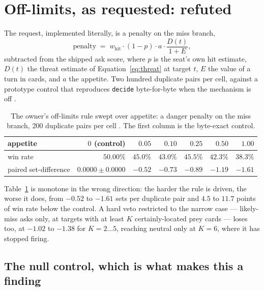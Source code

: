\documentclass[11pt]{article}
\newcommand{\code}[1]{\texttt{#1}}
\begin{document}
\section{Off-limits, as requested: refuted}
\label{sec:offlimits}

The request, implemented literally, is a penalty on the miss branch,
\begin{equation}
\label{eq:penalty}
\text{penalty} \;=\; w_{\mathrm{hit}} \cdot (1-p) \cdot a \cdot \frac{D(t)}{1+E},
\end{equation}
subtracted from the shipped ask score, where $p$ is the seat's own hit estimate, $D(t)$ the threat
estimate of Equation~\eqref{eq:threat} at target $t$, $E$ the value of a turn in cards, and $a$ the
appetite. Two hundred duplicate pairs per cell, against a prototype control that reproduces
\code{decide} byte-for-byte when the mechanism is off \cite{concession}.

\begin{table}[t]
\centering
\caption{The owner's off-limits rule swept over appetite: a danger penalty on the miss
branch, 200 duplicate pairs per cell \cite{concession}. The first column is the byte-exact control.}
\label{tab:offlimits}
\footnotesize
\begin{tabular}{@{}lrrrrrr@{}}
\toprule
appetite & $0$ (control) & $0.05$ & $0.10$ & $0.25$ & $0.50$ & $1.00$ \\
\midrule
win rate & $50.00\%$ & $45.0\%$ & $43.0\%$ & $45.5\%$ & $42.3\%$ & $\mathbf{38.3\%}$ \\
paired set-difference & $0.0000 \pm 0.0000$ & $-0.52$ & $-0.73$ & $-0.89$ & $-1.19$ & $\mathbf{-1.61}$ \\
\bottomrule
\end{tabular}
\end{table}

Table~\ref{tab:offlimits} is monotone in the wrong direction: the harder the rule is driven, the
worse it does, from $-0.52$ to $-1.61$ sets per duplicate pair and $4.5$ to $11.7$ points of win
rate below the control. A hard veto restricted to the narrow case --- likely-miss asks only, at
targets with at least $K$ certainly-located prey cards --- loses too, at $-1.02$ to $-1.38$ for $K =
2 \ldots 5$, reaching neutral only at $K = 6$, where it has stopped firing.

\subsection{The null control, which is what makes this a finding}
\label{sec:null}
\end{document}
